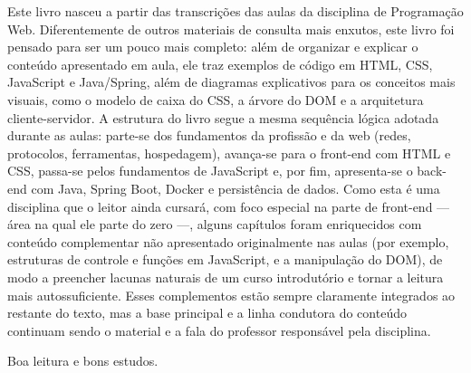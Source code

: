 Este livro nasceu a partir das transcrições das aulas da disciplina de Programação Web. Diferentemente de outros materiais de consulta mais enxutos, este livro foi pensado para ser um pouco mais completo: além de organizar e explicar o conteúdo apresentado em aula, ele traz exemplos de código em HTML, CSS, JavaScript e Java/Spring, além de diagramas explicativos para os conceitos mais visuais, como o modelo de caixa do CSS, a árvore do DOM e a arquitetura cliente-servidor. A estrutura do livro segue a mesma sequência lógica adotada durante as aulas: parte-se dos fundamentos da profissão e da web (redes, protocolos, ferramentas, hospedagem), avança-se para o front-end com HTML e CSS, passa-se pelos fundamentos de JavaScript e, por fim, apresenta-se o back-end com Java, Spring Boot, Docker e persistência de dados. Como esta é uma disciplina que o leitor ainda cursará, com foco especial na parte de front-end — área na qual ele parte do zero —, alguns capítulos foram enriquecidos com conteúdo complementar não apresentado originalmente nas aulas (por exemplo, estruturas de controle e funções em JavaScript, e a manipulação do DOM), de modo a preencher lacunas naturais de um curso introdutório e tornar a leitura mais autossuficiente. Esses complementos estão sempre claramente integrados ao restante do texto, mas a base principal e a linha condutora do conteúdo continuam sendo o material e a fala do professor responsável pela disciplina.

Boa leitura e bons estudos.

